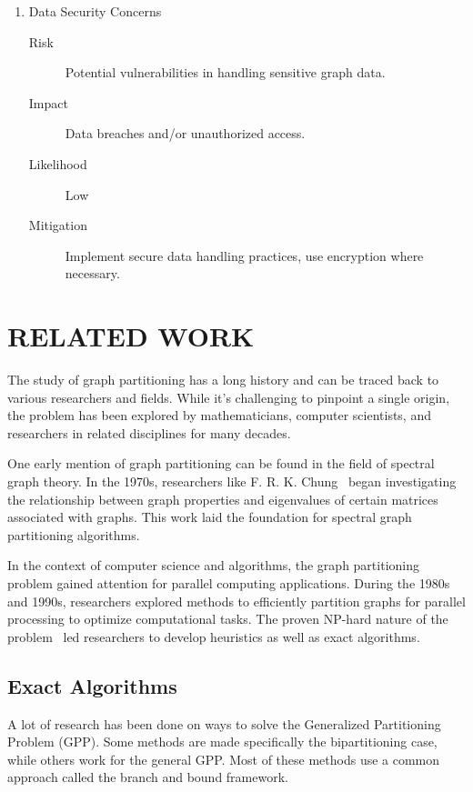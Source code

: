 \documentclass[a4paper,12pt]{report}
\begin{document}
\begin{enumerate}
\begin{enumerate}
			\item Data Security Concerns

				\begin{description}
					\item[Risk] Potential vulnerabilities in handling sensitive graph data.
					\item[Impact] Data breaches and/or unauthorized access.
					\item[Likelihood] Low
					\item[Mitigation] Implement secure data handling practices, use encryption where necessary.
				\end{description}
		\end{enumerate}
\end{enumerate}

\chapter{RELATED WORK}

The study of graph partitioning has a long history and can be traced back to various researchers and fields. While it's challenging to pinpoint a single origin, the problem has been explored by mathematicians, computer scientists, and researchers in related disciplines for many decades.

One early mention of graph partitioning can be found in the field of spectral graph theory. In the 1970s, researchers like F. R. K. Chung~\cite{chung1997spectral} began investigating the relationship between graph properties and eigenvalues of certain matrices associated with graphs. This work laid the foundation for spectral graph partitioning algorithms.

In the context of computer science and algorithms, the graph partitioning problem gained attention for parallel computing applications. During the 1980s and 1990s, researchers explored methods to efficiently partition graphs for parallel processing to optimize computational tasks. The proven NP-hard nature of the problem~\cite{feldmann} led researchers to develop heuristics as well as exact algorithms.

\section{Exact Algorithms}

A lot of research has been done on ways to solve the Generalized Partitioning Problem (GPP). Some methods are made specifically the bipartitioning case, while others work for the general GPP. Most of these methods use a common approach called the branch and bound framework.
\end{document}
